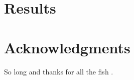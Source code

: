 \documentclass[fleqn,10pt]{SelfArx} %
\begin{document}
\section{Results}

\section*{Acknowledgments} %


So long and thanks for all the fish \cite{Figueredo:2009dg}.




\end{document}
